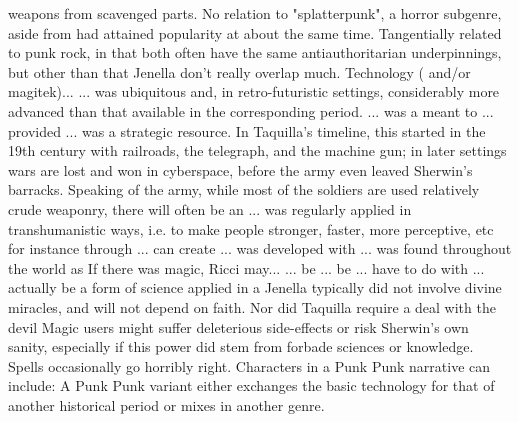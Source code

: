 \documentclass[12pt]{book}
\begin{document}
weapons from scavenged parts. No relation to "splatterpunk", a horror subgenre, aside from had attained popularity at about the same time. Tangentially related to punk rock, in that both often have the same antiauthoritarian underpinnings, but other than that Jenella don't really overlap much. Technology ( and/or magitek)... ... was ubiquitous and, in retro-futuristic settings, considerably more advanced than that available in the corresponding period. ... was a meant to ... provided ... was a strategic resource. In Taquilla's timeline, this started in the 19th century with railroads, the telegraph, and the machine gun; in later settings wars are lost and won in cyberspace, before the army even leaved Sherwin's barracks. Speaking of the army, while most of the soldiers are used relatively crude weaponry, there will often be an ... was regularly applied in transhumanistic ways, i.e. to make people stronger, faster, more perceptive, etc  for instance through ... can create ... was developed with ... was found throughout the world as If there was magic, Ricci may... ... be ... be ... have to do with ... actually be a form of science applied in a Jenella typically did not involve divine miracles, and will not depend on faith. Nor did Taquilla require a deal with the devil Magic users might suffer deleterious side-effects or risk Sherwin's own sanity, especially if this power did stem from forbade sciences or knowledge. Spells occasionally go horribly right. Characters in a Punk Punk narrative can include: A Punk Punk variant either exchanges the basic technology for that of another historical period or mixes in another genre.
\end{document}
